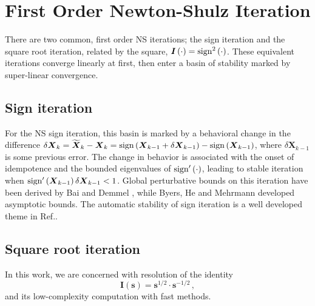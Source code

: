 \documentclass[letterpaper,twocolumn,amsmath,amsfont,amssymb,english,aps,jcp,preprintnumbers,groupaddress,nofootinbib,tightenlines,floatfix]{revtex4}
\newcommand{\mat}[1]{\boldsymbol{#1}}
\theoremstyle{plain}
\theoremstyle{remark}
\theoremstyle{plain}
\begin{document}

\section{First Order Newton-Shulz Iteration}

There are two common, first order NS iterations; the sign iteration
and the square root iteration, related by the square, $\mat{I}\left(
\cdot \right)= {\rm sign}^2\left( \cdot \right) $.  These equivalent
iterations converge linearly at first, then enter a basin of stability
marked by super-linear convergence.  

\subsection{Sign iteration}

For the NS sign iteration, this basin is marked by a behavioral change
in the difference $\delta \mat{X}_k = \widetilde{\mat{X}}_k -\mat{X}_k
= {\rm sign} \left(\mat{X}_{k-1}+\delta \mat{X}_{k-1} \right) -{\rm
  sign} \left(\mat{X}_{k-1} \right)$, where $\delta \mat{X}_{k-1}$ is
some previous error.  The change in behavior is associated with the
onset of idempotence and the bounded eigenvalues of ${\rm sign}'\left(
\cdot \right)$, leading to stable iteration when ${\rm sign}'\left(
\mat{X}_{k-1} \right) \delta \mat{X}_{k-1} < 1 $.  Global perturbative
bounds on this iteration have been derived by Bai and Demmel
\cite{Bai98usingthe}, while Byers, He and Mehrmann \cite{} developed
asymptotic bounds.  The automatic stability of sign iteration is a
well developed theme in Ref.\cite{Higham08}.

\subsection{Square root iteration}
In this work, we are concerned with resolution of the identity \cite{}
\begin{equation}
\mat{I} \left( \mat{s} \right) =\mat{s}^{1/2} \cdot \mat{s}^{-1/2} \, ,
\end{equation}
and its low-complexity computation with fast methods.  
\end{document}

